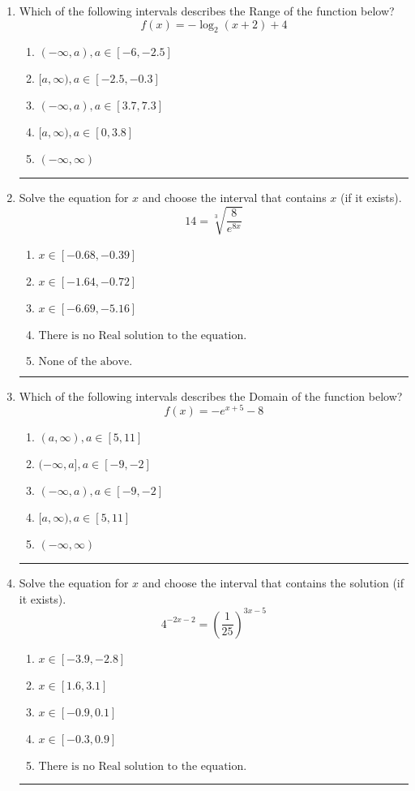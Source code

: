 \documentclass[14pt]{extbook}
\newcommand{\litem}[1]{\item#1\hspace*{-1cm}\rule{\textwidth}{0.4pt}}
\begin{document}
\begin{enumerate}
\litem{
Which of the following intervals describes the Range of the function below?\[ f(x) = -\log_2{(x+2)}+4 \]\begin{enumerate}[label=\Alph*.]
\item \( (-\infty, a), a \in [-6, -2.5] \)
\item \( [a, \infty), a \in [-2.5, -0.3] \)
\item \( (-\infty, a), a \in [3.7, 7.3] \)
\item \( [a, \infty), a \in [0, 3.8] \)
\item \( (-\infty, \infty) \)

\end{enumerate} }
\litem{
 Solve the equation for $x$ and choose the interval that contains $x$ (if it exists).\[  14 = \sqrt[3]{\frac{8}{e^{8x}}} \]\begin{enumerate}[label=\Alph*.]
\item \( x \in [-0.68, -0.39] \)
\item \( x \in [-1.64, -0.72] \)
\item \( x \in [-6.69, -5.16] \)
\item \( \text{There is no Real solution to the equation.} \)
\item \( \text{None of the above.} \)

\end{enumerate} }
\litem{
Which of the following intervals describes the Domain of the function below?\[ f(x) = -e^{x+5}-8 \]\begin{enumerate}[label=\Alph*.]
\item \( (a, \infty), a \in [5, 11] \)
\item \( (-\infty, a], a \in [-9, -2] \)
\item \( (-\infty, a), a \in [-9, -2] \)
\item \( [a, \infty), a \in [5, 11] \)
\item \( (-\infty, \infty) \)

\end{enumerate} }
\litem{
Solve the equation for $x$ and choose the interval that contains the solution (if it exists).\[ 4^{-2x-2} = \left(\frac{1}{25}\right)^{3x-5} \]\begin{enumerate}[label=\Alph*.]
\item \( x \in [-3.9, -2.8] \)
\item \( x \in [1.6, 3.1] \)
\item \( x \in [-0.9, 0.1] \)
\item \( x \in [-0.3, 0.9] \)
\item \( \text{There is no Real solution to the equation.} \)


\end{enumerate}}
\end{enumerate}
\end{document}
